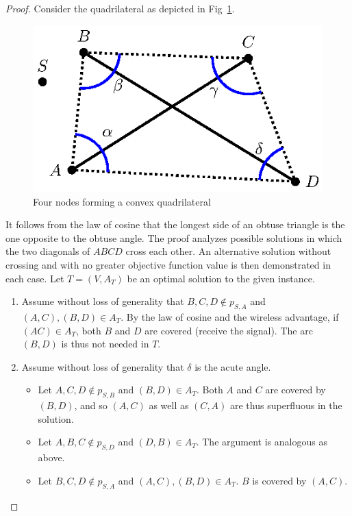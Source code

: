 \begin{proof}
Consider the quadrilateral as depicted in Fig~\ref{fig:quad}. 
\begin{figure}[htb!]
  \centering
  \includegraphics[scale=1.4]{figurer/quadrilat.eps}
  \caption{Four nodes forming a convex quadrilateral}
  \label{fig:quad}
\end{figure}
It follows from the law of cosine that the longest side of an obtuse triangle is the one opposite to the obtuse angle.
The proof analyzes possible solutions in which the two diagonals of $ABCD$ cross each other.
An alternative solution without crossing and with no greater objective function value is then demonstrated in each case.
Let $T=(V,A_T)$ be an optimal solution to the given instance.
\begin{enumerate}
	\item Assume without loss of generality that $B,C,D\not\in p_{S,A}$ and $(A,C),(B,D)\in A_T$.
		By the law of cosine and the wireless advantage, if $(AC)\in A_T$, both $B$ and $D$ are covered (receive the signal). 
		The arc $(B,D)$ is thus not needed in $T$.
	\item Assume without loss of generality that $\delta$ is the acute angle.
		\begin{itemize}
			\item Let $A,C,D\not\in p_{S,B}$ and $(B,D)\in A_T$. Both $A$ and $C$ are covered by $(B,D)$, and so $(A,C)$ as well as $(C,A)$ are thus superfluous in the solution.
			\item Let $A,B,C\not\in p_{S,D}$ and $(D,B)\in A_T$. The argument is analogous as above.
			\item Let $B,C,D\not\in p_{S,A}$ and $(A,C), (B,D)\in A_T$. $B$ is covered by $(A,C)$. 

\end{itemize}
\end{enumerate}
\end{proof}
